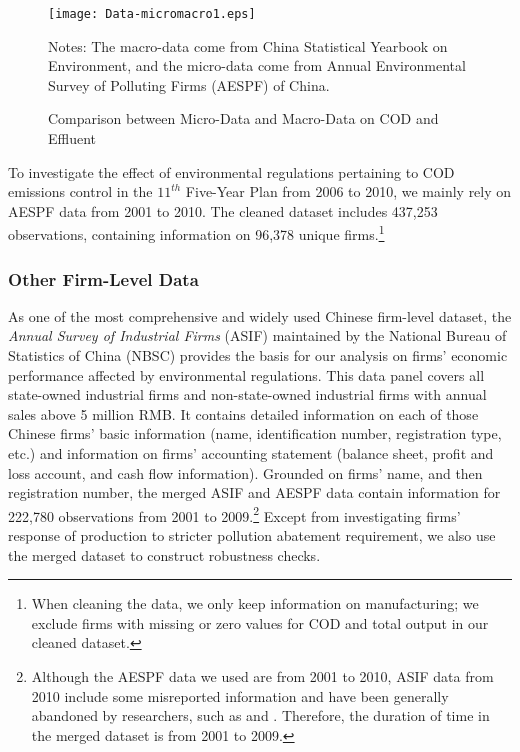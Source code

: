 \documentclass[12pt,english]{article}
\newcommand\fnote[1]{\captionsetup{justification=justified, textfont=footnotesize}\caption*{#1}}
\begin{document}
\begin{figure}[htbp]
	\caption{Comparison between Micro-Data and Macro-Data on COD and Effluent}
	\label{fig:Data-micromacro1.eps}
	\centering
	\texttt{[image: Data-micromacro1.eps]}
	\fnote{Notes: The macro-data come from China Statistical Yearbook on Environment, and the micro-data come from Annual Environmental Survey of Polluting Firms (AESPF) of China.}
\end{figure}

To investigate the effect of environmental regulations pertaining to COD emissions control in the $11^{th}$ Five-Year Plan from 2006 to 2010, we mainly rely on AESPF data from 2001 to 2010. The cleaned dataset includes 437,253 observations, containing information on 96,378 unique firms.\footnote{When cleaning the data, we only keep information on manufacturing; we exclude firms with missing or zero values for COD and total output in our cleaned dataset.}

\subsubsection{Other Firm-Level Data}

As one of the most comprehensive and widely used Chinese firm-level dataset, the \textit{Annual Survey of Industrial Firms} (ASIF) maintained by the National Bureau of Statistics of China (NBSC) provides the basis for our analysis on firms' economic performance affected by environmental regulations. This data panel covers all state-owned industrial firms and non-state-owned industrial firms with annual sales above 5 million RMB. It contains detailed information on each of those Chinese firms' basic information (name, identification number, registration type, etc.) and information on firms' accounting statement (balance sheet, profit and loss account, and cash flow information). Grounded on firms' name, and then registration number, the merged ASIF and AESPF data contain information for 222,780 observations from 2001 to 2009.\footnote{Although the AESPF data we used are from 2001 to 2010, ASIF data from 2010 include some misreported information and have been generally abandoned by researchers, such as \citet*{fan2018minimum} and \citet*{konig2018imitation}. Therefore, the duration of time in the merged dataset is from 2001 to 2009.} Except from investigating firms' response of production to stricter pollution abatement requirement, we also use the merged dataset to construct robustness checks.
\end{document}

